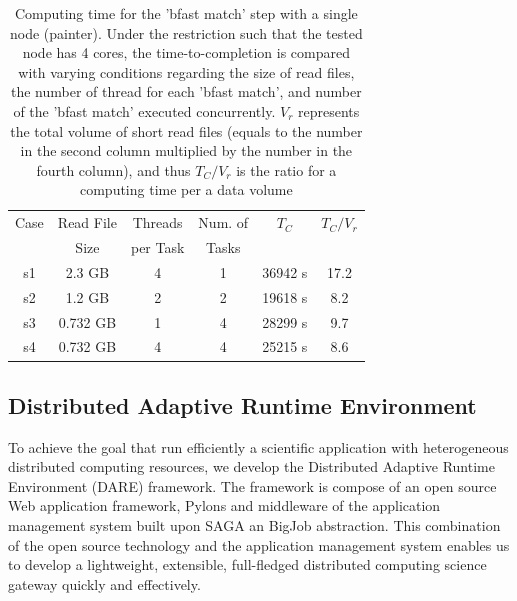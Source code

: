 \documentclass{acm_proc_article-sp}
\begin{document}
 \begin{table}
 \small
 \begin{tabular}{|c|c|c|c|c|c|} 
 \hline 
Case & Read File  & Threads & Num. of   & $T_C$ & $T_C/V_{r}$ \\
& Size &  per Task &  Tasks &  &  \\  \hline
s1 & 2.3 GB &  4 & 1 & 36942 s & 17.2  \\
s2 & 1.2 GB & 2 & 2 & 19618 s & 8.2 \\
s3 & 0.732 GB & 1 & 4 & 28299 s  & 9.7\\ 
s4& 0.732  GB & 4 & 4 & 25215 s & 8.6 \\

 \hline
 \end{tabular}
  \label{table:understandio}
 \caption{Computing time for the 'bfast match' step with a single node
   (painter). Under the restriction such that the tested node has 4
   cores, the time-to-completion is compared with varying conditions
   regarding the size of read files, the number of thread for each
   'bfast match', and number of the 'bfast match' executed concurrently.  $V_r$ represents the total volume of short read files (equals to the number in the second column multiplied by the number in the fourth column), and thus $T_C/V_{r}$ is the ratio for a computing time per a data volume}
   
\end{table}





\subsection{Distributed Adaptive Runtime Environment}

To achieve the goal that run efficiently a scientific application with heterogeneous distributed
computing resources, we develop the Distributed Adaptive Runtime
Environment (DARE) framework\cite{dareurl}.  The framework is compose
of an open source Web application framework, Pylons and middleware of
the application management system built upon SAGA an BigJob
abstraction\cite{saga-ccgrid10,saga-royalsoc,saga-web,jha2009developing,ecmls10}.
This combination of the open source technology and the application
management system enables us to develop a lightweight, extensible,
full-fledged distributed computing science gateway quickly and
effectively\cite{pylonsurl}.
\end{document}
